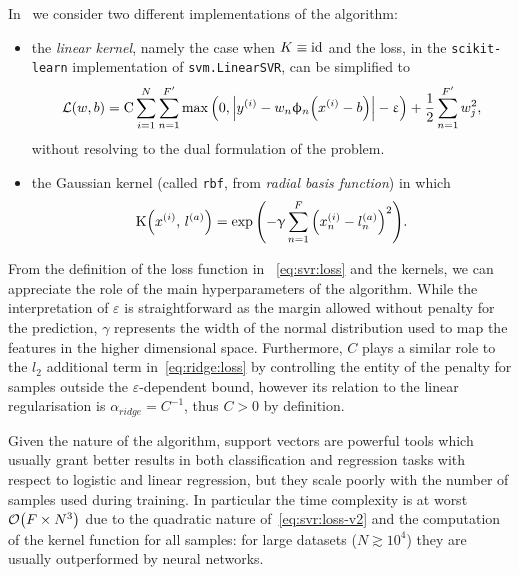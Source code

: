 In~ we consider two different implementations of the \svm algorithm:
\begin{itemize}
  \item the \textit{linear kernel}, namely the case when $K \equiv \mathrm{id}$ and the loss, in the \texttt{scikit-learn} implementation of \texttt{svm.LinearSVR}, can be simplified to
  \begin{equation}
    \mathcal{L}(w, b)
    =
    \mathrm{C} \sum\limits_{i = 1}^{N} \sum\limits_{n = 1}^{F'} \max\qty( 0, \abs{ y^{(i)} - w_n \upphi_n\qty( x^{(i)} - b) } - \upvarepsilon ) + \frac{1}{2} \sum\limits_{n = 1}^{F'} w_j^2,
  \end{equation}
  without resolving to the dual formulation of the problem.

  \item the Gaussian kernel (called \texttt{rbf}, from \textit{radial basis function}) in which
  \begin{equation}
    \mathrm{K}\qty(x^{(i)},\, l^{(a)})
    =
    \exp\qty( - \upgamma \sum\limits_{n = 1}^{F} \qty( x^{(i)}_n - l^{(a)}_n )^2 ).
  \end{equation}
\end{itemize}
From the definition of the loss function in ~\eqref{eq:svr:loss} and the kernels, we can appreciate the role of the main hyperparameters of the algorithm.
While the interpretation of $\varepsilon$ is straightforward as the margin allowed without penalty for the prediction, $\gamma$ represents the width of the normal distribution used to map the features in the higher dimensional space.
Furthermore, $C$ plays a similar role to the $l_2$ additional term in~\eqref{eq:ridge:loss} by controlling the entity of the penalty for samples outside the $\varepsilon$-dependent bound, however its relation to the linear regularisation is $\alpha_{ridge} = C^{-1}$, thus $C > 0$ by definition.

Given the nature of the algorithm, support vectors are powerful tools which usually grant better results in both classification and regression tasks with respect to logistic and linear regression, but they scale poorly with the number of samples used during training.
In particular the time complexity is at worst $\order{F \times N^3}$ due to the quadratic nature of~\eqref{eq:svr:loss-v2} and the computation of the kernel function for all samples: for large datasets ($N \gtrsim 10^4$) they are usually outperformed by neural networks.\footnotemark{}


